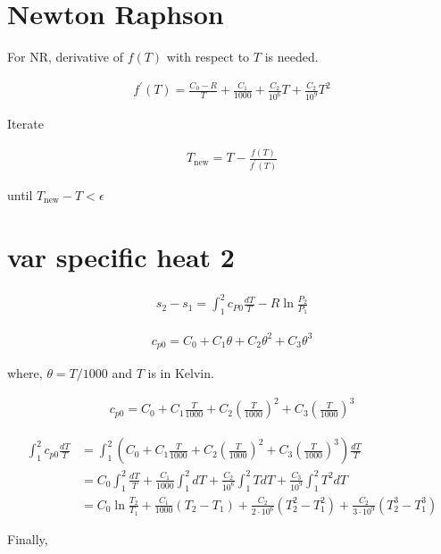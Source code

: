 \documentclass{article}
\begin{document}
	\section{Newton Raphson}

	For NR, derivative of $f(T)$ with respect to $T$ is needed.

	\begin{align*}
		f^\prime(T) = \frac{C_0 - R}{T} + \frac{C_1}{1000} + \frac{C_2}{10^6}T + \frac{C_2}{10^9}T^2
	\end{align*}

	Iterate

	\begin{align*}
		T_\text{new} = T - \frac{f(T)}{f^\prime(T)}
	\end{align*}

	until $T_\text{new} - T < \epsilon$

	\section{var specific heat 2}

	\begin{align*}
		s_2 - s_1 = \int_1^2 c_{P0}\frac{dT}{T} - R\ln\frac{P_2}{P_1}
	\end{align*}

	\begin{align*}
		c_{p0} = C_0 + C_1\theta + C_2\theta^2 + C_3\theta^3
	\end{align*}

	where, $\theta=T/1000$ and $T$ is in Kelvin.

	\begin{align*}
		c_{p0} = C_0 + C_1\frac{T}{1000} + C_2\left(\frac{T}{1000}\right)^2 + C_3\left(\frac{T}{1000}\right)^3
	\end{align*}

	\begin{align*}
		\int_1^2 c_{p0}\frac{dT}{T}
		&=
		\int_1^2 \left(C_0 + C_1\frac{T}{1000} + C_2\left(\frac{T}{1000}\right)^2 + C_3\left(\frac{T}{1000}\right)^3\right)\frac{dT}{T}\\
		&=
		C_0\int_1^2 \frac{dT}{T} + \frac{C_1}{1000}\int_1^2 dT + \frac{C_2}{10^6}\int_1^2 TdT + \frac{C_3}{10^9}\int_1^2 T^2dT\\
		&=
		C_0\ln\frac{T_2}{T_1} + \frac{C_1}{1000}(T_2 - T_1) + \frac{C_2}{2\cdot10^6}(T_2^2 - T_1^2) + \frac{C_2}{3\cdot10^9}(T_2^3 - T_1^3)
	\end{align*}

	Finally,
\end{document}
